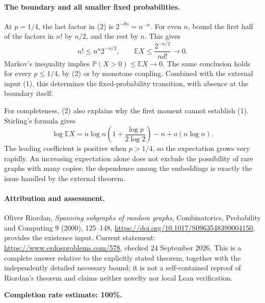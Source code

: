 \paragraph{The boundary and all smaller fixed probabilities.}
At \(p=1/4\), the last factor in (2) is \(2^{-dn}=n^{-n}\). For even \(n\), bound the first half of the factors in \(n!\) by \(n/2\), and the rest by \(n\). This gives
\[
 n!\leq n^n2^{-n/2},\qquad
 \mathbb E X\leq\frac{2^{-n/2}}{n d!}\longrightarrow0.
\]
Markov's inequality implies \(\mathbb P(X>0)\leq\mathbb E X\to0\). The same conclusion holds for every \(p\leq1/4\), by (2) or by monotone coupling. Combined with the external input (1), this determines the fixed-probability transition, with absence at the boundary itself.

For completeness, (2) also explains why the first moment cannot establish (1). Stirling's formula gives
\[
 \log\mathbb E X
 =n\log n\left(1+\frac{\log p}{2\log2}\right)-n+o(n\log n).
\]
The leading coefficient is positive when \(p>1/4\), so the expectation grows very rapidly. An increasing expectation alone does not exclude the possibility of rare graphs with many copies; the dependence among the embeddings is exactly the issue handled by the external theorem.

\paragraph{Attribution and assessment.}
Oliver Riordan, \emph{Spanning subgraphs of random graphs}, Combinatorics, Probability and Computing 9 (2000), 125--148, \url{https://doi.org/10.1017/S0963548399004150}, provides the existence input. Current statement: \url{https://www.erdosproblems.com/578}, checked 24 September 2026. This is a complete answer relative to the explicitly stated theorem, together with the independently detailed necessary bound; it is not a self-contained reproof of Riordan's theorem and claims neither novelty nor local Lean verification.

\textbf{Completion rate estimate: 100\%.}
